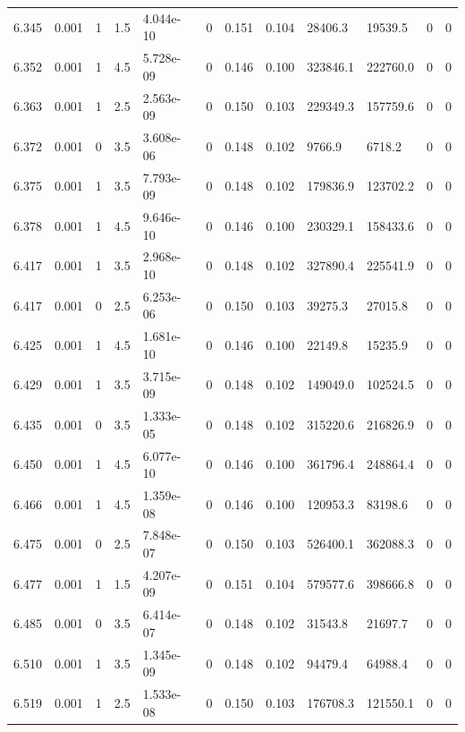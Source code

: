 \documentclass[preview]{standalone}
\begin{document}
{{{{{{{{{{{{{{{\begin{tabular}{L{1.2cm}C{1.2cm} C{0.3cm}C{0.5cm} C{1.4cm}C{1.4cm} C{1.4cm}C{1.4cm} C{1.6cm}C{1.6cm} C{1.6cm}C{1.6cm}}
  6.345  &  0.001  & 1     & 1.5 &  4.044e-10  & 0  &  0.151&   0.104& 28406.3 & 19539.5   &  0 & 0  \\ 
  6.352  &  0.001  & 1     & 4.5 &  5.728e-09  & 0  &  0.146&   0.100& 323846.1 & 222760.0   &  0 & 0  \\ 
  6.363  &  0.001  & 1     & 2.5 &  2.563e-09  & 0  &  0.150&   0.103& 229349.3 & 157759.6   &  0 & 0  \\ 
  6.372  &  0.001  & 0     & 3.5 &  3.608e-06  & 0  &  0.148&   0.102& 9766.9 & 6718.2   &  0 & 0  \\ 
  6.375  &  0.001  & 1     & 3.5 &  7.793e-09  & 0  &  0.148&   0.102& 179836.9 & 123702.2   &  0 & 0  \\ 
  6.378  &  0.001  & 1     & 4.5 &  9.646e-10  & 0  &  0.146&   0.100& 230329.1 & 158433.6   &  0 & 0  \\ 
  6.417  &  0.001  & 1     & 3.5 &  2.968e-10  & 0  &  0.148&   0.102& 327890.4 & 225541.9   &  0 & 0  \\ 
  6.417  &  0.001  & 0     & 2.5 &  6.253e-06  & 0  &  0.150&   0.103& 39275.3 & 27015.8   &  0 & 0  \\ 
  6.425  &  0.001  & 1     & 4.5 &  1.681e-10  & 0  &  0.146&   0.100& 22149.8 & 15235.9   &  0 & 0  \\ 
  6.429  &  0.001  & 1     & 3.5 &  3.715e-09  & 0  &  0.148&   0.102& 149049.0 & 102524.5   &  0 & 0  \\ 
  6.435  &  0.001  & 0     & 3.5 &  1.333e-05  & 0  &  0.148&   0.102& 315220.6 & 216826.9   &  0 & 0  \\ 
  6.450  &  0.001  & 1     & 4.5 &  6.077e-10  & 0  &  0.146&   0.100& 361796.4 & 248864.4   &  0 & 0  \\ 
  6.466  &  0.001  & 1     & 4.5 &  1.359e-08  & 0  &  0.146&   0.100& 120953.3 & 83198.6   &  0 & 0  \\ 
  6.475  &  0.001  & 0     & 2.5 &  7.848e-07  & 0  &  0.150&   0.103& 526400.1 & 362088.3   &  0 & 0  \\ 
  6.477  &  0.001  & 1     & 1.5 &  4.207e-09  & 0  &  0.151&   0.104& 579577.6 & 398666.8   &  0 & 0  \\ 
  6.485  &  0.001  & 0     & 3.5 &  6.414e-07  & 0  &  0.148&   0.102& 31543.8 & 21697.7   &  0 & 0  \\ 
  6.510  &  0.001  & 1     & 3.5 &  1.345e-09  & 0  &  0.148&   0.102& 94479.4 & 64988.4   &  0 & 0  \\ 
  6.519  &  0.001  & 1     & 2.5 &  1.533e-08  & 0  &  0.150&   0.103& 176708.3 & 121550.1   &  0 & 0  \\ 

\end{tabular}}}}}}}}}}}}}}}}
\end{document}
